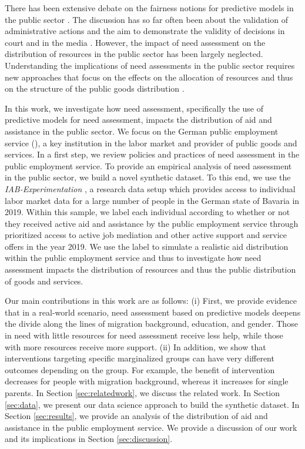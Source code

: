 \documentclass{article} %
\begin{document}
There has been extensive debate on the fairness notions for predictive models in the public sector \citep{barocas-hardt-narayanan,perdomo2023difficult}. The discussion has so far often been about the validation of administrative actions and the aim to demonstrate the validity of decisions in court and in the media \citep{Bach_Kern_Mautner_Kreuter_2023, wang2024}. However, the impact of need assessment on the distribution of resources in the public sector has been largely neglected. Understanding the implications of need assessments in the public sector requires new approaches that focus on the effects on the allocation of resources and thus on the structure of the public goods distribution \citep{kleinberg2015prediction}.

In this work, we investigate how need assessment, specifically the use of predictive models for need assessment, impacts the distribution of aid and assistance in the public sector. We focus on the German public employment service (\pshg), a key institution in the labor market and provider of public goods and services. In a first step, we review policies and practices of need assessment in the public employment service. To provide an empirical analysis of need assessment in the public sector, we build a novel synthetic dataset. To this end, we use the \emph{IAB-Experimentation} \citep{10.1145/3588001.3609369}, a research data setup which provides access to individual labor market data for a large number of people in the German state of Bavaria in 2019. Within this sample, we label each individual according to whether or not they received active aid and assistance by the public employment service through prioritized access to active job mediation and other active support and service offers in the year 2019. We use the label to simulate a realistic aid distribution within the public employment service and thus to investigate how need assessment impacts the distribution of resources and thus the public distribution of goods and services. 


Our main contributions in this work are as follows: (i) First, we provide evidence that in a real-world scenario, need assessment based on predictive models deepens the divide along the lines of migration background, education, and gender. Those in need with little resources for need assessment receive less help, while those with more resources receive more support. (ii) In addition, we show that interventions targeting specific marginalized groups can have very different outcomes depending on the group. For example, the benefit of intervention decreases for people with migration background, whereas it increases for single parents. In Section \ref{sec:relatedwork}, we discuss the related work. In Section \ref{sec:data}, we present our data science approach to build the synthetic dataset. In Section \ref{sec:results}, we provide an analysis of the distribution of aid and assistance in the public employment service. We provide a discussion of our work and its implications in Section \ref{sec:discussion}.
\end{document}
